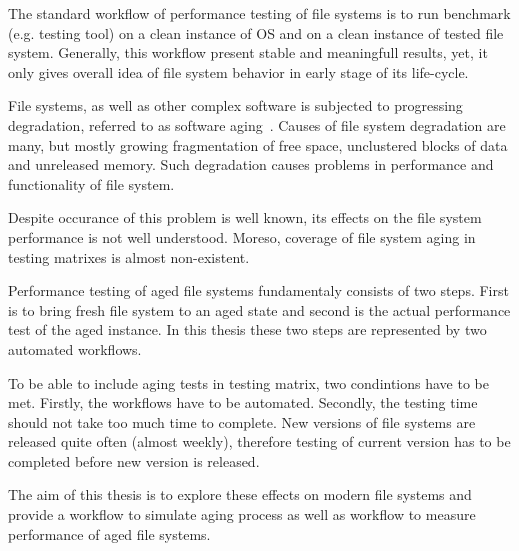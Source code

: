 \documentclass[
  color, %
  table, %
  lof,   %
  lot,   %
]{fithesis3}
\begin{document}

The standard workflow of performance testing of file systems is to run benchmark (e.g. testing tool) on a clean instance of OS and on a clean instance of tested file system. Generally, this workflow present stable and meaningfull results, yet, it only gives overall idea of file system behavior in early stage of its life-cycle. 

File systems, as well as other complex software is subjected to progressing degradation, referred to as software aging~\cite{Cotroneo:2010:SAA:1913797.1914413}. Causes of file system degradation are many, but mostly growing fragmentation of free space, unclustered blocks of data and unreleased memory. Such degradation causes problems in performance and functionality of file system.

Despite occurance of this problem is well known, its effects on the file system performance is not well understood. Moreso, coverage of file system aging in testing matrixes is almost non-existent.

Performance testing of aged file systems fundamentaly consists of two steps. First is to bring fresh file system to an aged state and second is the actual performance test of the aged instance. In this thesis these two steps are represented by two automated workflows. 

To be able to include aging tests in testing matrix, two condintions have to be met. Firstly, the workflows have to be automated. Secondly, the testing time should not take too much time to complete. New versions of file systems are released quite often (almost weekly), therefore testing of current version has to be completed before new version is released.

The aim of this thesis is to explore these effects on modern file systems and provide a workflow to simulate aging process as well as workflow to measure performance of aged file systems.

\end{document}
